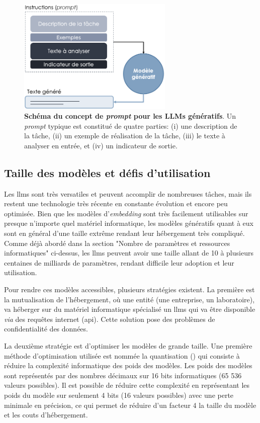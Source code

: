 \begin{figure}[!htbp]
 \centering
 \includegraphics[width=0.66\textwidth]{figures/promt_llm.png}
 \caption[Schéma du concept de \textit{prompt} pour les LLMs génératifs]{\textbf{Schéma du concept de \textit{prompt} pour les LLMs génératifs}. Un \textit{prompt} typique est constitué de quatre parties: (i) une description de la tâche, (ii) un exemple de réalisation de la tâche, (iii) le texte à analyser en entrée, et (iv) un indicateur de sortie.}
 \label{fig:llm-prompt}
\end{figure}

\subsection{Taille des modèles et défis d'utilisation}
Les \gls{llms} sont très versatiles et peuvent accomplir de nombreuses tâches, mais ils restent une technologie très récente en constante évolution et encore peu optimisée. Bien que les modèles d'\textit{embedding} sont très facilement utilisables sur presque n'importe quel matériel informatique, les modèles génératifs quant à eux sont en général d'une taille extrême rendant leur hébergement très compliqué. Comme déjà abordé dans la section "Nombre de paramètres et ressources informatiques" ci-dessus, les \gls{llms} peuvent avoir une taille allant de 10 à plusieurs centaines de milliards de paramètres, rendant difficile leur adoption et leur utilisation.


Pour rendre ces modèles accessibles, plusieurs stratégies existent. La première est la mutualisation de l'hébergement, où une entité (une entreprise, un laboratoire), va héberger sur du matériel informatique spécialisé un \gls{llms} qui va être disponible \textit{via} des requêtes internet (\gls{api}). Cette solution pose des problèmes de confidentialité des données. 

La deuxième stratégie est d'optimiser les modèles de grande taille. Une première méthode d'optimisation utilisée est nommée la quantisation (\cite{dettmers_case_2023, dettmers_llmint8_2022}) qui consiste à réduire la complexité informatique des poids des modèles. Les poids des modèles sont représentés par des nombres décimaux sur 16 bits informatiques (65 536 valeurs possibles). Il est possible de réduire cette complexité en représentant les poids du modèle sur seulement 4 bits (16 valeurs possibles) avec une perte minimale en précision, ce qui permet de réduire d'un facteur 4 la taille du modèle et les couts d'hébergement.

